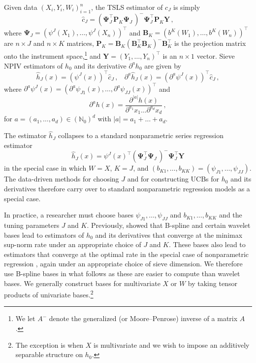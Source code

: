 \documentclass[
]{jss}
\begin{document}
Given data \((X_i,Y_i,W_i)_{i=1}^n\), the TSLS estimator of \(c_J\) is
simply \[
 \hat c_J = \left(\mathbf \Psi_J^\top \mathbf P_K^{\phantom \top} \mathbf \Psi_J^{\phantom \top} \right)^{-} \mathbf \Psi_J^\top \mathbf P_K^{\phantom \top} \mathbf Y \,,
\] where \(\mathbf \Psi_J = (\psi^J({X_1}),\ldots,\psi^J({X_n}))^\top\)
and \(\mathbf B_K = (b^K({W_1}),\ldots,b^K({W_n}))^\top\) are
\(n \times J\) and \(n \times K\) matrices,
\(\mathbf P_K = \mathbf B_K^{\phantom \prime} (\mathbf B_K^\top \mathbf B_K^{\phantom \top})^{-} \mathbf B_K^\top\)
is the projection matrix onto the instrument space,\footnote{We let
  \(A^-\) denote the generalized (or Moore--Penrose) inverse of a matrix
  \(A\).} and \(\mathbf Y = (Y_1,\ldots,Y_n)^\top\) is an \(n \times 1\)
vector. Sieve NPIV estimators of \(h_0\) and its derivative
\(\partial^a h_0\) are given by \[
 \hat h_J(x) = (\psi^J(x))^\top \hat c_J \,,~~~~\partial^a \hat h_J(x) =(\partial^a \psi^J(x))^\top \hat c_J \,,
\] where
\(\partial^a \psi^J(x) = (\partial^a \psi_{J1}(x),\ldots,\partial^a \psi_{JJ}(x))^\top\)
and \[
 \partial^a h(x) = \frac{\partial^{|a|} h(x)}{\partial^{a_1} x_1 \ldots \partial^{a_d} x_d} \,,
\] for \(a = (a_1,\ldots,a_d) \in (\mathbb{N}_0)^d\) with
\(|a| = a_1 + \ldots + a_d\).

The estimator \(\hat h_J\) collapses to a standard nonparametric series
regression estimator \[
 \hat h_J(x) = \psi^J(x)^\top(\mathbf \Psi_J^\top\mathbf \Psi_J^{\phantom \top})^- \mathbf \Psi_J^\top \mathbf Y
\] in the special case in which \(W = X\), \(K = J\), and
\((b_{K1},\ldots,b_{KK}) = (\psi_{J1},\ldots,\psi_{JJ})\). The
data-driven methods for choosing \(J\) and for constructing UCBs for
\(h_0\) and its derivatives therefore carry over to standard
nonparametric regression models as a special case.

In practice, a researcher must choose bases
\(\psi_{J1},\ldots,\psi_{JJ}\) and \(b_{K1},\ldots,b_{KK}\) and the
tuning parameters \(J\) and \(K\). Previously, \citet{CCQE} showed that
B-spline and certain wavelet bases lead to estimators of \(h_0\) and its
derivatives that converge at the minimax sup-norm rate under an
appropriate choice of \(J\) and \(K\). These bases also lead to
estimators that converge at the optimal rate in the special case of
nonparametric regression \citep{BCCK, CC15Reg}, again under an
appropriate choice of sieve dimension. We therefore use B-spline bases
in what follows as these are easier to compute than wavelet bases. We
generally construct bases for multivariate \(X\) or \(W\) by taking
tensor products of univariate bases.\footnote{The exception is when
  \(X\) is multivariate and we wish to impose an additively separable
  structure on \(h_0\).}
\end{document}

